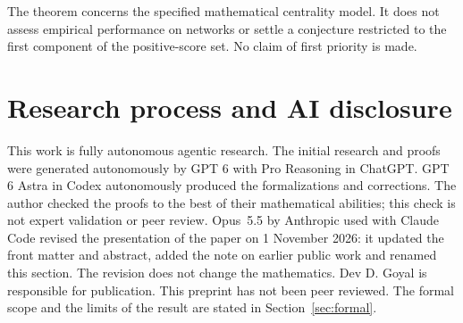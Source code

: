 \documentclass[11pt,a4paper]{article}
\begin{document}
The theorem concerns the specified mathematical centrality model.
It does not assess empirical performance on networks or settle a conjecture
restricted to the first component of the positive-score set.
No claim of first priority is made.

\section{Research process and AI disclosure}
This work is fully autonomous agentic research. The initial research and
proofs were generated autonomously by GPT 6 with Pro Reasoning in ChatGPT.
GPT 6 Astra in Codex autonomously produced the formalizations and
corrections. The author checked the proofs to the best of their mathematical
abilities; this check is not expert validation or peer review. Opus~5.5 by
Anthropic used with Claude Code revised the presentation of the paper on
1 November 2026: it updated the front matter and abstract, added the note on
earlier public work and renamed this section. The revision does not change
the mathematics. Dev D. Goyal is responsible for publication. This preprint
has not been peer reviewed. The formal scope and the limits of
the result are stated in Section~\ref{sec:formal}.



\end{document}

